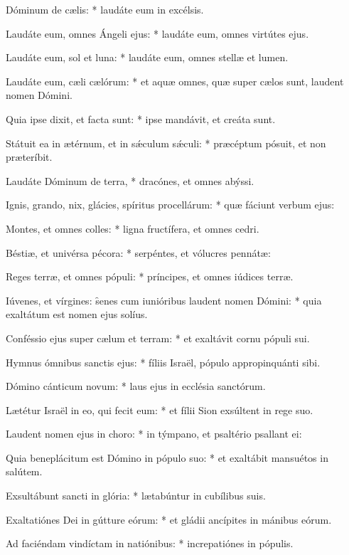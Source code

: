 \begin{psalmus}

 Dóminum de cælis: * laudáte eum in excélsis.

Laudáte eum, omnes Ángeli ejus: * laudáte eum, omnes virtútes ejus.

Laudáte eum, sol et luna: * laudáte eum, omnes stellæ et lumen.

Laudáte eum, cæli cælórum: * et aquæ omnes, quæ super cælos sunt, laudent nomen Dómini.

Quia ipse dixit, et facta sunt: * ipse mandávit, et creáta sunt.

Státuit ea in ætérnum, et in sǽculum sǽculi: * præcéptum pósuit, et non præteríbit.

Laudáte Dóminum de terra, * dracónes, et omnes abýssi.

Ignis, grando, nix, glácies, spíritus procellárum: * quæ fáciunt verbum ejus:

Montes, et omnes colles: * ligna fructífera, et omnes cedri.

Béstiæ, et univérsa pécora: * serpéntes, et vólucres pennátæ:

Reges terræ, et omnes pópuli: * príncipes, et omnes iúdices terræ.

Iúvenes, et vírgines: \f senes cum iunióribus laudent nomen Dómini: * quia exaltátum est nomen ejus solíus.

Conféssio ejus super cælum et terram: * et exaltávit cornu pópuli sui.

Hymnus ómnibus sanctis ejus: * fíliis Israël, pópulo appropinquánti sibi.



 Dómino cánticum novum: * laus ejus in ecclésia sanctórum.

Lætétur Israël in eo, qui fecit eum: * et fílii Sion exsúltent in rege suo.

Laudent nomen ejus in choro: * in týmpano, et psaltério psallant ei:

Quia beneplácitum est Dómino in pópulo suo: * et exaltábit mansuétos in salútem.

Exsultábunt sancti in glória: * lætabúntur in cubílibus suis.

Exaltatiónes Dei in gútture eórum: * et gládii ancípites in mánibus eórum.

Ad faciéndam vindíctam in natiónibus: * increpatiónes in pópulis.


\end{psalmus}
